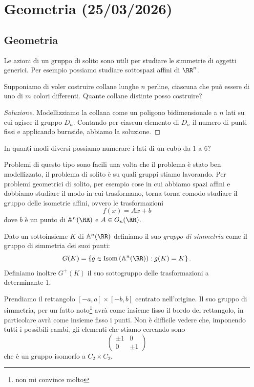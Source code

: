 \documentclass[11pt]{scrartcl}
\begin{document}
	\section{Geometria (25/03/2026)}
	
	\subsection{Geometria}
	
	Le azioni di un gruppo di solito sono utili per studiare le simmetrie di oggetti generici. Per esempio possiamo studiare sottospazi affini di $\RR^n$.
	\begin{example}
		Supponiamo di voler costruire collane lunghe $n$ perline, ciascuna che può essere di uno di $m$ colori differenti. Quante collane distinte posso costruire?
	\end{example} 
	\begin{proof}[Soluzione]
		Modellizziamo la collana come un poligono bidimensionale a $n$ lati su cui agisce il gruppo $D_n$. Contando per ciascun elemento di $D_n$ il numero di punti fissi e applicando burnside, abbiamo la soluzione.
	\end{proof}
	\begin{problem}
		In quanti modi diversi possiamo numerare i lati di un cubo da $1$ a $6$?
	\end{problem}
	Problemi di questo tipo sono facili una volta che il problema è stato ben modellizzato, il problema di solito è su quali gruppi stiamo lavorando. Per problemi geometrici di solito, per esempio cose in cui abbiamo spazi affini e dobbiamo studiare il modo in cui trasformano, torna torna comodo studiare il gruppo delle isometrie affini, ovvero le trasformazioni
	$$f(x)=Ax+b$$
	dove $b$ è un punto di $\mathbb{A}^n(\RR)$ e $A\in O_n(\RR)$. 
	\begin{definition}
		Dato un sottoinsieme $K$ di $\mathbb{A}^n(\RR)$ definiamo il suo \textit{gruppo di simmetria} come il gruppo di simmetria dei suoi punti:
		$$G(K)=\left\{g\in \text{Isom}\left(\mathbb{A}^n(\RR)\right):g(K)=K\right\}.$$ 
		Definiamo inoltre $G^+(K)$ il suo sottogruppo delle trasformazioni a determinante $1$.
	\end{definition} 
	\begin{example}[Rettangolo]
		Prendiamo il rettangolo $[-a,a]\times[-b,b]$ centrato nell'origine. Il suo gruppo di simmetria, per un fatto noto\footnote{non mi convince molto} avrà come insieme fisso il bordo del rettangolo, in particolare avrà come insieme fisso i punti. Non è difficile vedere che, imponendo tutti i possibili cambi, gli elementi che stiamo cercando sono
		$$\begin{pmatrix}
			\pm 1 & 0 \\
			0 & \pm 1
		\end{pmatrix}$$
		che è un gruppo isomorfo a $C_2\times C_2$.
	\end{example}
\end{document}

